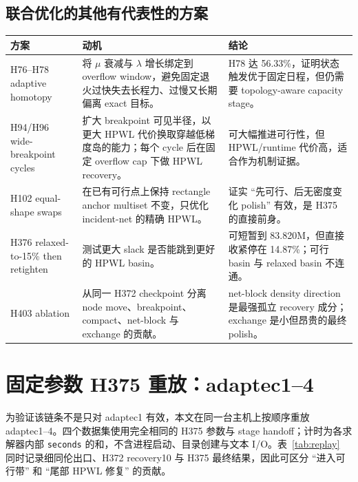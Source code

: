\documentclass[UTF8,a4paper,11pt]{ctexrep}
\begin{document}
\section{联合优化的其他有代表性的方案}
\begin{longtable}{p{2.5cm}p{5.0cm}p{4.0cm}}
\toprule 方案 & 动机 & 结论\\\midrule\endhead
H76--H78 adaptive homotopy & 将 $\mu$ 衰减与 $\lambda$ 增长绑定到 overflow window，避免固定退火过快失去长程力、过慢又长期偏离 exact 目标。 & H78 达 56.33\%，证明状态触发优于固定日程，但仍需要 topology-aware capacity stage。\\
H94/H96 wide-breakpoint cycles & 扩大 breakpoint 可见半径，以更大 HPWL 代价换取穿越低梯度岛的能力；每个 cycle 后在固定 overflow cap 下做 HPWL recovery。 & 可大幅推进可行性，但 HPWL/runtime 代价高，适合作为机制证据。\\
H102 equal-shape swaps & 在已有可行点上保持 rectangle anchor multiset 不变，只优化 incident-net 的精确 HPWL。 & 证实 ``先可行、后无密度变化 polish'' 有效，是 H375 的直接前身。\\
H376 relaxed-to-15\% then retighten & 测试更大 slack 是否能跳到更好的 HPWL basin。 & 可短暂到 83.820M，但直接收紧停在 14.87\%；可行 basin 与 relaxed basin 不连通。\\
H403 ablation & 从同一 H372 checkpoint 分离 node move、breakpoint、compact、net-block 与 exchange 的贡献。 & net-block density direction 是最强孤立 recovery 成分；exchange 是小但昂贵的最终 polish。\\
\bottomrule
\end{longtable}

\chapter{固定参数 H375 重放：adaptec1--4}
为验证该链条不是只对 adaptec1 有效，本文在同一台主机上按顺序重放 adaptec1--4。四个数据集使用完全相同的 H375 参数与 stage handoff；计时为各求解器内部 \texttt{seconds} 的和，不含进程启动、目录创建与文本 I/O。表~\ref{tab:replay} 同时记录细同伦出口、H372 recovery10 与 H375 最终结果，因此可区分 ``进入可行带'' 和 ``尾部 HPWL 修复'' 的贡献。
\end{document}
